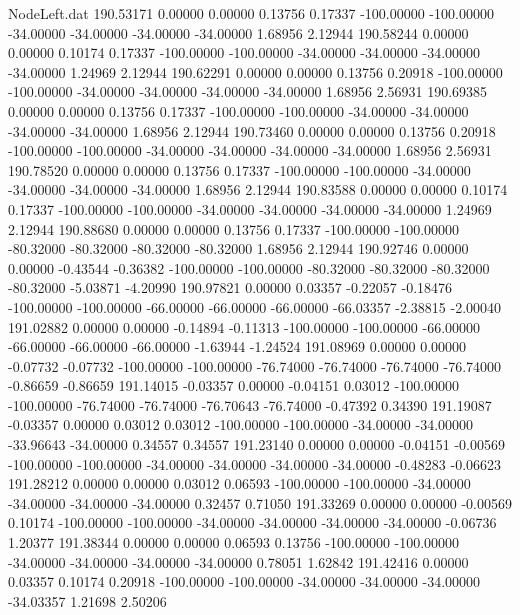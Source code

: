 \begin{filecontents}{NodeLeft.dat}
 190.53171    0.00000    0.00000     0.13756    0.17337 -100.00000 -100.00000  -34.00000  -34.00000  -34.00000  -34.00000    1.68956    2.12944
 190.58244    0.00000    0.00000     0.10174    0.17337 -100.00000 -100.00000  -34.00000  -34.00000  -34.00000  -34.00000    1.24969    2.12944
 190.62291    0.00000    0.00000     0.13756    0.20918 -100.00000 -100.00000  -34.00000  -34.00000  -34.00000  -34.00000    1.68956    2.56931
 190.69385    0.00000    0.00000     0.13756    0.17337 -100.00000 -100.00000  -34.00000  -34.00000  -34.00000  -34.00000    1.68956    2.12944
 190.73460    0.00000    0.00000     0.13756    0.20918 -100.00000 -100.00000  -34.00000  -34.00000  -34.00000  -34.00000    1.68956    2.56931
 190.78520    0.00000    0.00000     0.13756    0.17337 -100.00000 -100.00000  -34.00000  -34.00000  -34.00000  -34.00000    1.68956    2.12944
 190.83588    0.00000    0.00000     0.10174    0.17337 -100.00000 -100.00000  -34.00000  -34.00000  -34.00000  -34.00000    1.24969    2.12944
 190.88680    0.00000    0.00000     0.13756    0.17337 -100.00000 -100.00000  -80.32000  -80.32000  -80.32000  -80.32000    1.68956    2.12944
 190.92746    0.00000    0.00000    -0.43544   -0.36382 -100.00000 -100.00000  -80.32000  -80.32000  -80.32000  -80.32000   -5.03871   -4.20990
 190.97821    0.00000    0.03357    -0.22057   -0.18476 -100.00000 -100.00000  -66.00000  -66.00000  -66.00000  -66.03357   -2.38815   -2.00040
 191.02882    0.00000    0.00000    -0.14894   -0.11313 -100.00000 -100.00000  -66.00000  -66.00000  -66.00000  -66.00000   -1.63944   -1.24524
 191.08969    0.00000    0.00000    -0.07732   -0.07732 -100.00000 -100.00000  -76.74000  -76.74000  -76.74000  -76.74000   -0.86659   -0.86659
 191.14015   -0.03357    0.00000    -0.04151    0.03012 -100.00000 -100.00000  -76.74000  -76.74000  -76.70643  -76.74000   -0.47392    0.34390
 191.19087   -0.03357    0.00000     0.03012    0.03012 -100.00000 -100.00000  -34.00000  -34.00000  -33.96643  -34.00000    0.34557    0.34557
 191.23140    0.00000    0.00000    -0.04151   -0.00569 -100.00000 -100.00000  -34.00000  -34.00000  -34.00000  -34.00000   -0.48283   -0.06623
 191.28212    0.00000    0.00000     0.03012    0.06593 -100.00000 -100.00000  -34.00000  -34.00000  -34.00000  -34.00000    0.32457    0.71050
 191.33269    0.00000    0.00000    -0.00569    0.10174 -100.00000 -100.00000  -34.00000  -34.00000  -34.00000  -34.00000   -0.06736    1.20377
 191.38344    0.00000    0.00000     0.06593    0.13756 -100.00000 -100.00000  -34.00000  -34.00000  -34.00000  -34.00000    0.78051    1.62842
 191.42416    0.00000    0.03357     0.10174    0.20918 -100.00000 -100.00000  -34.00000  -34.00000  -34.00000  -34.03357    1.21698    2.50206

\end{filecontents}

